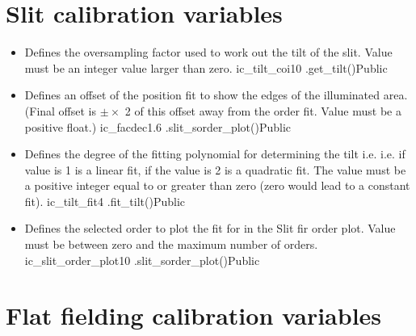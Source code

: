 \clearpage
\newpage
\section{Slit calibration variables}
\label{ch:variables:slit}

\begin{itemize}

\item {}
{Defines the oversampling factor used to work out the tilt of the slit. Value must be an integer value larger than zero.}
{ic\_tilt\_coi}{10}
{\calSLIT}{\constantsfile}{\spirouImage.get\_tilt()}{Public}


\item {}
{Defines an offset of the position fit to show the edges of the illuminated area. (Final offset is $\pm \times$ 2 of this offset away from the order fit. Value must be a positive float.)}
{ic\_facdec}{1.6}
{\calSLIT}{\constantsfile}{\spirouPlot.slit\_sorder\_plot()}{Public}


\item {}
{Defines the degree of the fitting polynomial for determining the tilt i.e. i.e. if value is 1 is a linear fit, if the value is 2 is a quadratic fit.  The value must be a positive integer equal to or greater than zero (zero would lead to a constant fit).}
{ic\_tilt\_fit}{4}
{\calSLIT}{\constantsfile}{\spirouImage.fit\_tilt()}{Public}


\item {}
{Defines the selected order to plot the fit for in the Slit fir order plot. Value must be between zero and the maximum number of orders.}
{ic\_slit\_order\_plot}{10}
{\calSLIT}{\constantsfile}{\spirouPlot.slit\_sorder\_plot()}{Public}


\end{itemize}






\clearpage
\newpage
\section{Flat fielding calibration variables}
\label{ch:variables:flatfielding}

